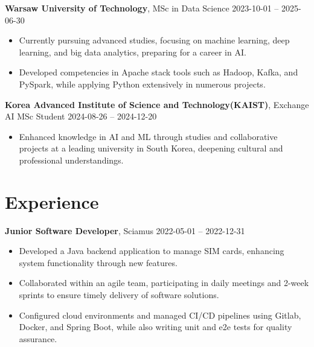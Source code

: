 \documentclass[10pt, letterpaper]{article}
\begin{document}
\begin{paracol}{2}
\noindent\textbf{Warsaw University of Technology}, MSc in Data Science \switchcolumn
\hfill 2023-10-01 -- 2025-06-30
\end{paracol}

\vspace{5pt}

\begin{itemize}
    
    \item Currently pursuing advanced studies, focusing on machine learning, deep learning, and big data analytics, preparing for a career in AI.
    
    \item Developed competencies in Apache stack tools such as Hadoop, Kafka, and PySpark, while applying Python extensively in numerous projects.
    
\end{itemize}

\begin{paracol}{2}
\noindent\textbf{Korea Advanced Institute of Science and Technology(KAIST)}, Exchange AI MSc Student \switchcolumn
\hfill 2024-08-26 -- 2024-12-20
\end{paracol}

\vspace{5pt}

\begin{itemize}
    
    \item Enhanced knowledge in AI and ML through studies and collaborative projects at a leading university in South Korea, deepening cultural and professional understandings.
    
\end{itemize}


\section*{Experience}

\begin{paracol}{2}
\noindent\textbf{Junior Software Developer}, Sciamus \switchcolumn
\hfill 2022-05-01 -- 2022-12-31
\end{paracol}

\vspace{5pt}

\begin{itemize}
    
    \item Developed a Java backend application to manage SIM cards, enhancing system functionality through new features.
    
    \item Collaborated within an agile team, participating in daily meetings and 2-week sprints to ensure timely delivery of software solutions.
    
    \item Configured cloud environments and managed CI/CD pipelines using Gitlab, Docker, and Spring Boot, while also writing unit and e2e tests for quality assurance.
    
\end{itemize}
\end{document}
